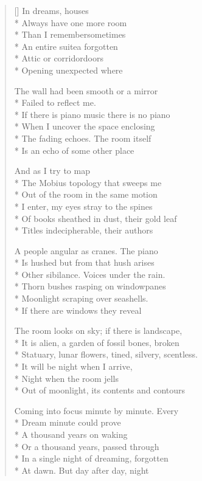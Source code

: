 \label{ch:dream_house}
\settowidth{\versewidth}{Statuary, lunar flowers, tined, silvery, scentless.}
\begin{verse}[\versewidth]
In dreams, houses\\*
Always have one more room\\*
Than I remember\qquad sometimes\\*
An entire suite\qquad a forgotten\\*
Attic or corridor\qquad doors\\*
Opening unexpected where

The wall had been smooth or a mirror\\*
Failed to reflect me.\\*
If there is piano music there is no piano\\*
When I uncover the space enclosing\\*
The fading echoes.  The room itself\\*
Is an echo of some other place

And as I try to map\\*
The Mobius topology that sweeps me\\*
Out of the room in the same motion\\*
I enter, my eyes stray to the spines\\*
Of books sheathed in dust, their gold leaf\\*
Titles indecipherable, their authors

A people angular as cranes.   The piano\\*
Is hushed but from that hush arises\\*
Other sibilance.   Voices under the rain.\\*
Thorn bushes rasping on windowpanes\\*
Moonlight scraping over seashells.\\*
If there are windows they reveal

The room looks on sky; if there is landscape,\\*
It is alien, a garden of fossil bones, broken\\*
Statuary, lunar flowers, tined, silvery, scentless.\\*
It will be night when I arrive,\\*
Night when the room jells\\*
Out of moonlight, its contents and contours


Coming into focus minute by minute.  Every\\*
Dream minute could prove\\*
A thousand years on waking\\*
Or a thousand years, passed through\\*
In a single night of dreaming, forgotten\\*
At dawn.  But day after day, night


\end{verse}
